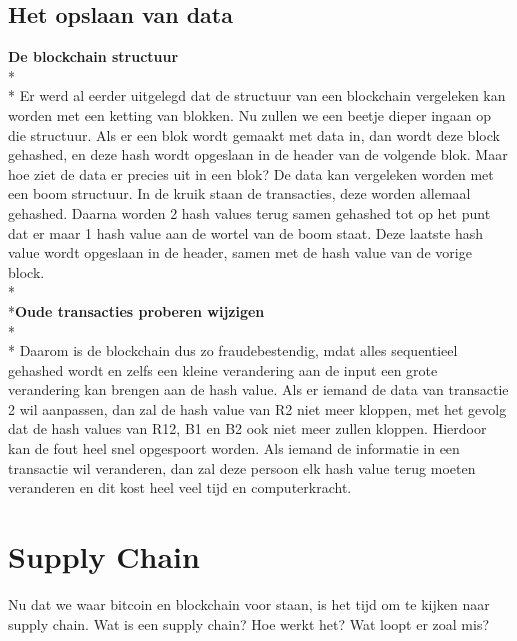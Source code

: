 \documentclass[fleqn,a4paper,12pt]{book}
\begin{document}
\section{Het opslaan van data}
\textbf{De blockchain structuur}\\*\\*
Er werd al eerder uitgelegd dat de structuur van een blockchain vergeleken kan worden met een ketting van blokken. Nu zullen we een beetje dieper ingaan op die structuur. Als er een blok wordt gemaakt met data in, dan wordt deze block gehashed, en deze hash wordt opgeslaan in de header van de volgende blok. Maar hoe ziet de data er precies uit in een blok? De data kan vergeleken worden met een boom structuur. In de kruik staan de transacties, deze worden allemaal gehashed. Daarna worden 2 hash values terug samen gehashed tot op het punt dat er maar 1 hash value aan de wortel van de boom staat. Deze laatste hash value wordt opgeslaan in de header, samen met de hash value van de vorige block.
\\*\\*\textbf{Oude transacties proberen wijzigen}\\*\\*
Daarom is de blockchain dus zo fraudebestendig, mdat alles sequentieel gehashed wordt en zelfs een kleine verandering aan de input een grote verandering kan brengen aan de hash value. Als er iemand de data van transactie 2 wil aanpassen, dan zal de hash value van R2 niet meer kloppen, met het gevolg dat de hash values van R12, B1 en B2 ook niet meer zullen kloppen. Hierdoor kan de fout heel snel opgespoort worden. Als iemand de informatie in een transactie wil veranderen, dan zal deze persoon elk hash value terug moeten veranderen en dit kost heel veel tijd en computerkracht.

\chapter{Supply Chain}
Nu dat we waar bitcoin en blockchain voor staan, is het tijd om te kijken naar supply chain. Wat is een supply chain? Hoe werkt het? Wat loopt er zoal mis?
\end{document}
